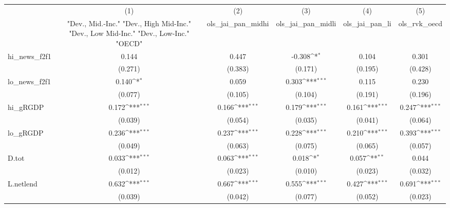 {
\def\sym#1{\ifmmode^{#1}\else\(^{#1}\)\fi}
\begin{tabular}{l*{5}{c}}
\toprule
            &\multicolumn{1}{c}{(1)}&\multicolumn{1}{c}{(2)}&\multicolumn{1}{c}{(3)}&\multicolumn{1}{c}{(4)}&\multicolumn{1}{c}{(5)}\\
            &\multicolumn{1}{c}{ "Dev., Mid.-Inc." "Dev., High Mid-Inc." "Dev., Low Mid-Inc." "Dev., Low-Inc." "OECD" }&\multicolumn{1}{c}{ols\_jai\_pan\_midhi}&\multicolumn{1}{c}{ols\_jai\_pan\_midli}&\multicolumn{1}{c}{ols\_jai\_pan\_li}&\multicolumn{1}{c}{ols\_rvk\_oecd}\\
\midrule
hi\_news\_f2f1&       0.144         &       0.447         &      -0.308\sym{*}  &       0.104         &       0.301         \\
            &     (0.271)         &     (0.383)         &     (0.171)         &     (0.195)         &     (0.428)         \\
\addlinespace
lo\_news\_f2f1&       0.140\sym{*}  &       0.059         &       0.303\sym{***}&       0.115         &       0.230         \\
            &     (0.077)         &     (0.105)         &     (0.104)         &     (0.191)         &     (0.196)         \\
\addlinespace
hi\_gRGDP    &       0.172\sym{***}&       0.166\sym{***}&       0.179\sym{***}&       0.161\sym{***}&       0.247\sym{***}\\
            &     (0.039)         &     (0.054)         &     (0.035)         &     (0.041)         &     (0.064)         \\
\addlinespace
lo\_gRGDP    &       0.236\sym{***}&       0.237\sym{***}&       0.228\sym{***}&       0.210\sym{***}&       0.393\sym{***}\\
            &     (0.049)         &     (0.063)         &     (0.075)         &     (0.065)         &     (0.057)         \\
\addlinespace
D.tot       &       0.033\sym{***}&       0.063\sym{***}&       0.018\sym{*}  &       0.057\sym{**} &       0.044         \\
            &     (0.012)         &     (0.023)         &     (0.010)         &     (0.023)         &     (0.032)         \\
\addlinespace
L.netlend   &       0.632\sym{***}&       0.667\sym{***}&       0.555\sym{***}&       0.427\sym{***}&       0.691\sym{***}\\
            &     (0.039)         &     (0.042)         &     (0.077)         &     (0.052)         &     (0.023)         \\

\end{tabular}}

